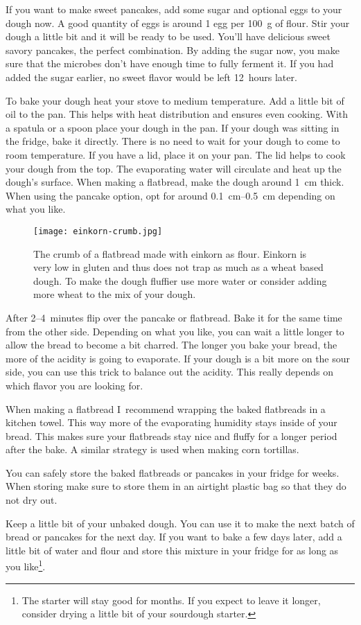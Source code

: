 If you want to make sweet pancakes, add some sugar and optional eggs to your dough
now. A good quantity of eggs is around 1 egg per \qty{100}{\gram} of flour.
Stir your dough a little bit and it will be ready to be used. You'll
have delicious sweet savory pancakes, the perfect combination. By
adding the sugar now, you make sure that the microbes don't have
enough time to fully ferment it. If you had added the sugar
earlier, no sweet flavor would be left  12~hours later.

To bake your dough heat your stove to medium temperature. Add a little bit of
oil to the pan. This helps with heat distribution and ensures even cooking.
With a spatula or a spoon place your dough in the pan. If your dough
was sitting in the fridge, bake it directly. There is no need to wait for your
dough to come to room temperature. If you have a lid,
place it on your pan. The lid helps to cook your dough from the top.
The evaporating water will circulate and heat up the dough's surface. When
making a flatbread, make the dough around \qty{1}{\cm} thick. When using the
pancake option, opt for around \qtyrange{0.1}{0.5}{\cm} depending on what you
like.

\begin{figure}[htb!]
\begin{center}
  \texttt{[image: einkorn-crumb.jpg]}
  \caption{The crumb of a flatbread made with einkorn as flour. Einkorn
  is very low in gluten and thus does not trap as much  as a wheat based
  dough. To make the dough fluffier use more water or consider adding
  more wheat to the mix of your dough.}
\end{center}
\end{figure}

After 2--4~minutes flip over the pancake or flatbread. Bake it for the same
time from the other side. Depending on what you like, you can wait a little
longer to allow the bread to become a bit charred. The longer you
bake your bread, the more of the acidity is going to evaporate. If your
dough is a bit more on the sour side, you can use this trick to balance
out the acidity. This really depends on which flavor you are looking for.

When making a flatbread I~recommend wrapping the baked flatbreads
in a kitchen towel. This way more of the evaporating humidity
stays inside of your bread. This makes sure your flatbreads stay
nice and fluffy for a longer period after the bake. A similar strategy is
used when making corn tortillas.

You can safely store the baked flatbreads or pancakes in your fridge
for weeks. When storing make sure to store them in an airtight plastic bag so that
they do not dry out.

Keep a little bit of your unbaked dough. You can use it to make the next
batch of bread or pancakes for the next day. If you want to bake a few days later, add
a little bit of water and flour and store this mixture in your fridge
for as long as you like\footnote{The starter will stay good for months. If you expect to
leave it longer, consider drying a little bit of your sourdough starter.}.
